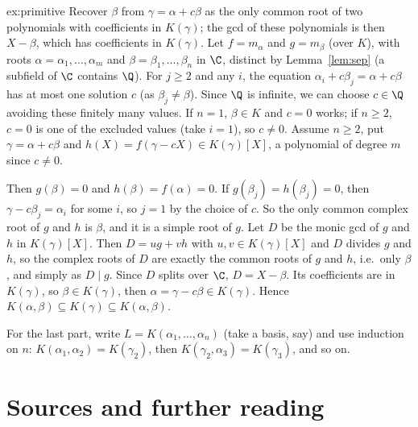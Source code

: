 \begin{solution}{ex:primitive}
\idea Recover $\beta$ from $\gamma=\alpha+c\beta$ as the only common root of two polynomials with coefficients in $K(\gamma)$; the gcd of these polynomials is then $X-\beta$, which has coefficients in $K(\gamma)$.
\writeup Let $f=m_\alpha$ and $g=m_\beta$ (over $K$), with roots $\alpha=\alpha_1,\dots,\alpha_m$ and $\beta=\beta_1,\dots,\beta_n$ in $\C$, distinct by Lemma~\ref{lem:sep} (a subfield of $\C$ contains $\Q$). For $j\ge2$ and any $i$, the equation $\alpha_i+c\beta_j=\alpha+c\beta$ has at most one solution $c$ (as $\beta_j\ne\beta$). Since $\Q$ is infinite, we can choose $c\in\Q$ avoiding these finitely many values. If $n=1$, $\beta\in K$ and $c=0$ works; if $n\ge2$, $c=0$ is one of the excluded values (take $i=1$), so $c\ne0$. Assume $n\ge2$, put $\gamma=\alpha+c\beta$ and $h(X)=f(\gamma-cX)\in K(\gamma)[X]$, a polynomial of degree $m$ since $c\ne0$.

Then $g(\beta)=0$ and $h(\beta)=f(\alpha)=0$. If $g(\beta_j)=h(\beta_j)=0$, then $\gamma-c\beta_j=\alpha_i$ for some $i$, so $j=1$ by the choice of $c$. So the only common complex root of $g$ and $h$ is $\beta$, and it is a simple root of $g$. Let $D$ be the monic gcd of $g$ and $h$ in $K(\gamma)[X]$. Then $D=ug+vh$ with $u,v\in K(\gamma)[X]$ and $D$ divides $g$ and $h$, so the complex roots of $D$ are exactly the common roots of $g$ and $h$, i.e.\ only $\beta$, and simply as $D\mid g$. Since $D$ splits over $\C$, $D=X-\beta$. Its coefficients are in $K(\gamma)$, so $\beta\in K(\gamma)$, then $\alpha=\gamma-c\beta\in K(\gamma)$. Hence $K(\alpha,\beta)\subseteq K(\gamma)\subseteq K(\alpha,\beta)$.

For the last part, write $L=K(\alpha_1,\dots,\alpha_n)$ (take a basis, say) and use induction on $n$: $K(\alpha_1,\alpha_2)=K(\gamma_2)$, then $K(\gamma_2,\alpha_3)=K(\gamma_3)$, and so on.
\end{solution}

\section*{Sources and further reading}

